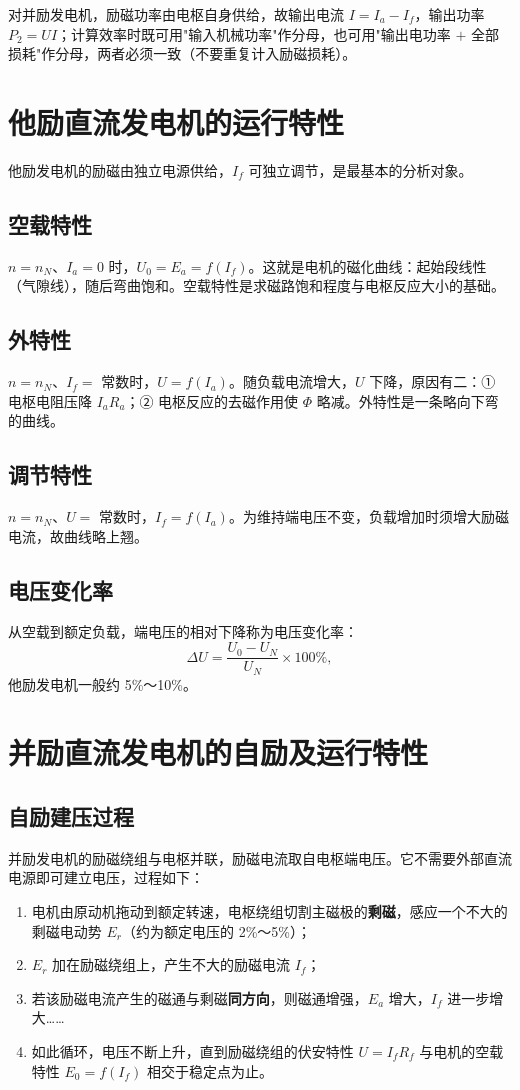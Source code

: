 对并励发电机，励磁功率由电枢自身供给，故输出电流 $I=I_a-I_f$，输出功率 $P_2=UI$；计算效率时既可用"输入机械功率"作分母，也可用"输出电功率 $+$ 全部损耗"作分母，两者必须一致（不要重复计入励磁损耗）。

\section{他励直流发电机的运行特性}

他励发电机的励磁由独立电源供给，$I_f$ 可独立调节，是最基本的分析对象。

\subsection{空载特性}
$n=n_N$、$I_a=0$ 时，$U_0=E_a=f(I_f)$。这就是电机的磁化曲线：起始段线性（气隙线），随后弯曲饱和。空载特性是求磁路饱和程度与电枢反应大小的基础。

\subsection{外特性}
$n=n_N$、$I_f=$ 常数时，$U=f(I_a)$。随负载电流增大，$U$ 下降，原因有二：① 电枢电阻压降 $I_aR_a$；② 电枢反应的去磁作用使 $\Phi$ 略减。外特性是一条略向下弯的曲线。

\subsection{调节特性}
$n=n_N$、$U=$ 常数时，$I_f=f(I_a)$。为维持端电压不变，负载增加时须增大励磁电流，故曲线略上翘。

\subsection{电压变化率}
从空载到额定负载，端电压的相对下降称为电压变化率：
\begin{equation}
\Delta U=\frac{U_0-U_N}{U_N}\times100\% ,
\end{equation}
他励发电机一般约 5\%～10\%。

\section{并励直流发电机的自励及运行特性}

\subsection{自励建压过程}
并励发电机的励磁绕组与电枢并联，励磁电流取自电枢端电压。它不需要外部直流电源即可建立电压，过程如下：
\begin{enumerate}
  \item 电机由原动机拖动到额定转速，电枢绕组切割主磁极的\textbf{剩磁}，感应一个不大的剩磁电动势 $E_r$（约为额定电压的 2\%～5\%）；
  \item $E_r$ 加在励磁绕组上，产生不大的励磁电流 $I_f$；
  \item 若该励磁电流产生的磁通与剩磁\textbf{同方向}，则磁通增强，$E_a$ 增大，$I_f$ 进一步增大……
  \item 如此循环，电压不断上升，直到励磁绕组的伏安特性 $U=I_fR_f$ 与电机的空载特性 $E_0=f(I_f)$ 相交于稳定点为止。
\end{enumerate}

